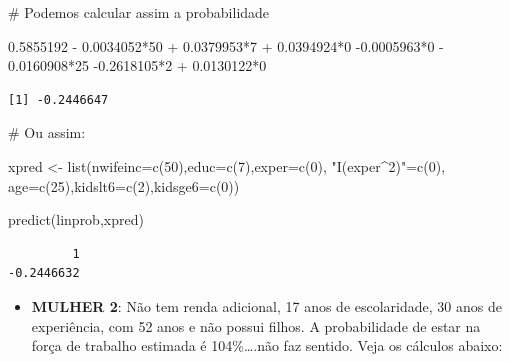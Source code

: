 \documentclass[
  letterpaper,
  DIV=11,
  numbers=noendperiod]{scrreprt}
\newenvironment{Shaded}{\begin{snugshade}}{\end{snugshade}}
\newcommand{\AttributeTok}[1]{\textcolor[rgb]{0.40,0.45,0.13}{#1}}
\newcommand{\CommentTok}[1]{\textcolor[rgb]{0.37,0.37,0.37}{#1}}
\newcommand{\DecValTok}[1]{\textcolor[rgb]{0.68,0.00,0.00}{#1}}
\newcommand{\FloatTok}[1]{\textcolor[rgb]{0.68,0.00,0.00}{#1}}
\newcommand{\FunctionTok}[1]{\textcolor[rgb]{0.28,0.35,0.67}{#1}}
\newcommand{\NormalTok}[1]{\textcolor[rgb]{0.00,0.23,0.31}{#1}}
\newcommand{\OtherTok}[1]{\textcolor[rgb]{0.00,0.23,0.31}{#1}}
\newcommand{\SpecialCharTok}[1]{\textcolor[rgb]{0.37,0.37,0.37}{#1}}
\newcommand{\StringTok}[1]{\textcolor[rgb]{0.13,0.47,0.30}{#1}}
\providecommand{\tightlist}{%
  \setlength{\itemsep}{0pt}\setlength{\parskip}{0pt}}
\begin{document}
\begin{Shaded}
\begin{Highlighting}[]
\CommentTok{\# Podemos calcular assim a probabilidade }

\FloatTok{0.5855192} \SpecialCharTok{{-}} \FloatTok{0.0034052}\SpecialCharTok{*}\DecValTok{50}  \SpecialCharTok{+} \FloatTok{0.0379953}\SpecialCharTok{*}\DecValTok{7}  \SpecialCharTok{+} \FloatTok{0.0394924}\SpecialCharTok{*}\DecValTok{0}  \SpecialCharTok{{-}}\FloatTok{0.0005963}\SpecialCharTok{*}\DecValTok{0}  \SpecialCharTok{{-}} \FloatTok{0.0160908}\SpecialCharTok{*}\DecValTok{25}  \SpecialCharTok{{-}}\FloatTok{0.2618105}\SpecialCharTok{*}\DecValTok{2}  \SpecialCharTok{+} \FloatTok{0.0130122}\SpecialCharTok{*}\DecValTok{0}
\end{Highlighting}
\end{Shaded}

\begin{verbatim}
[1] -0.2446647
\end{verbatim}

\begin{Shaded}
\begin{Highlighting}[]
\CommentTok{\# Ou assim: }

\NormalTok{xpred }\OtherTok{\textless{}{-}} \FunctionTok{list}\NormalTok{(}\AttributeTok{nwifeinc=}\FunctionTok{c}\NormalTok{(}\DecValTok{50}\NormalTok{),}\AttributeTok{educ=}\FunctionTok{c}\NormalTok{(}\DecValTok{7}\NormalTok{),}\AttributeTok{exper=}\FunctionTok{c}\NormalTok{(}\DecValTok{0}\NormalTok{), }\StringTok{"I(exper\^{}2)"}\OtherTok{=}\FunctionTok{c}\NormalTok{(}\DecValTok{0}\NormalTok{),}
 \AttributeTok{age=}\FunctionTok{c}\NormalTok{(}\DecValTok{25}\NormalTok{),}\AttributeTok{kidslt6=}\FunctionTok{c}\NormalTok{(}\DecValTok{2}\NormalTok{),}\AttributeTok{kidsge6=}\FunctionTok{c}\NormalTok{(}\DecValTok{0}\NormalTok{))}

\FunctionTok{predict}\NormalTok{(linprob,xpred)}
\end{Highlighting}
\end{Shaded}

\begin{verbatim}
         1 
-0.2446632 
\end{verbatim}

\begin{itemize}
\tightlist
\item
  \textbf{MULHER 2}: Não tem renda adicional, 17 anos de escolaridade,
  30 anos de experiência, com 52 anos e não possui filhos. A
  probabilidade de estar na força de trabalho estimada é 104\%\ldots.não
  faz sentido. Veja os cálculos abaixo:
\end{itemize}
\end{document}
